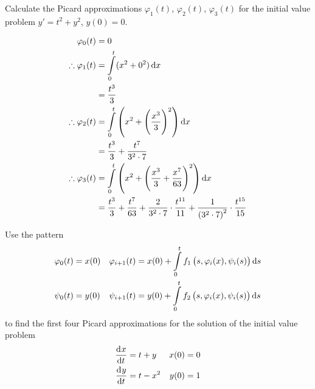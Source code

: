 \documentclass[fleqn, a4paper, 12pt, oneside]{amsart}
\theoremstyle{definition}
\theoremstyle{theorem}
\begin{document}
\begin{question}
	Calculate the Picard approximations $\varphi_1(t)$, $\varphi_2(t)$, $\varphi_3(t)$ for the initial value problem $y' = t^2 + y^2$, $y(0) = 0$.
\end{question}

\begin{solution}
	\begin{align*}
		\varphi_0(t)            & = 0                                                                                               \\
		\therefore \varphi_1(t) & = \int\limits_{0}^{t} (x^2 + 0^2) \dif x                                                          \\
                                        & = \frac{t^3}{3}                                                                                   \\
		\therefore \varphi_2(t) & = \int\limits_{0}^{t} \left( x^2 + \left( \frac{x^3}{3} \right)^2 \right) \dif x                  \\
                                        & = \frac{t^3}{3} + \frac{t^7}{3^2 \cdot 7}                                                         \\
		\therefore \varphi_3(t) & = \int\limits_{0}^{t} \left( x^2 + \left( \frac{x^3}{3} + \frac{x^7}{63} \right)^2 \right) \dif x \\
                                        & = \frac{t^3}{3} + \frac{t^7}{63} + \frac{2}{3^2 \cdot 7} \cdot \frac{t^{11}}{11} + \frac{1}{\left( 3^2 \cdot 7 \right)^2} \cdot \frac{t^{15}}{15}
	\end{align*}
\end{solution}

\begin{question}
	Use the pattern
	\begin{align*}
		\varphi_0(t) & = x(0) & \varphi_{i + 1}(t) & = x(0) + \int\limits_{0}^{t} f_1 \left( s, \varphi_i(x), \psi_i(s) \right) \dif s \\
		\psi_0(t)    & = y(0) & \psi_{i + 1}(t)    & = y(0) + \int\limits_{0}^{t} f_2 \left( s, \varphi_i(x), \psi_i(s) \right) \dif s
	\end{align*}
	to find the first four Picard approximations for the solution of the initial value problem
	\begin{align*}
		\dod{x}{t} & = t + y   & x(0) & = 0 \\
		\dod{y}{t} & = t - x^2 & y(0) & = 1
	\end{align*}
\end{question}
\end{document}
